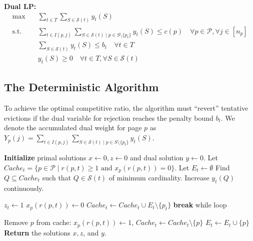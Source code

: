 \documentclass[a4paper]{article}
\begin{document}
\noindent\textbf{Dual LP:}
\begin{align*}
\max \quad & \sum_{t \in T} \sum_{S \in \mathcal{S}(t)} y_t(S) \\
\text{s.t.} \quad & \sum_{t \in I(p,j)} \sum_{S \in \mathcal{S}(t) \mid p \in S \setminus \{p_t\}} y_t(S) \le c(p) \quad \forall p \in \mathcal{P}, \forall j \in [n_p] \\
& \sum_{S \in \mathcal{S}(t)} y_t(S) \le b_t \quad \forall t \in T \\
& y_t(S) \ge 0 \quad \forall t \in T, \forall S \in \mathcal{S}(t)
\end{align*}

\subsection{The Deterministic Algorithm}
To achieve the optimal competitive ratio, the algorithm must ``revert'' tentative evictions if the dual variable for rejection reaches the penalty bound $b_t$. We denote the accumulated dual weight for page $p$ as $Y_p(j) = \sum_{t \in I(p,j)} \sum_{S \in \mathcal{S}(t) \mid p \in S \setminus \{p_t\}} y_t(S)$.

\begin{algorithm}
\caption{Deterministic Non-Linear Paging with Rejections}
\label{alg:deterministic_nlp_rejections}
\begin{algorithmic}[1]
\State \textbf{Initialize} primal solutions $x \gets 0, z \gets 0$ and dual solution $y \gets 0$.
    \State Let $Cache_t = \{p \in \mathcal{P} \mid r(p,t) \ge 1 \text{ and } x_p(r(p,t)) = 0\}$.
    \State Let $E_t \gets \emptyset$ 
        \State Find $Q \subseteq Cache_t$ such that $Q \in \mathcal{S}(t)$ of minimum cardinality.
            \State Increase $y_t(Q)$ continuously.
        \EndWhile
        
            \State $z_t \gets 1$ 
                \State $x_p(r(p,t)) \gets 0$ 
            \EndFor
            \State $Cache_t \gets Cache_t \cup E_t \setminus \{p_t\}$
            \State \textbf{break} while loop
        \EndIf
        
            \State Remove $p$ from cache: $x_p(r(p,t)) \gets 1$, $Cache_t \gets Cache_t \setminus \{p\}$
            \State $E_t \gets E_t \cup \{p\}$
        \EndFor
    \EndWhile
\EndFor
\State \textbf{Return} the solutions $x, z$, and $y$.
\end{algorithmic}
\end{algorithm}
\end{document}
